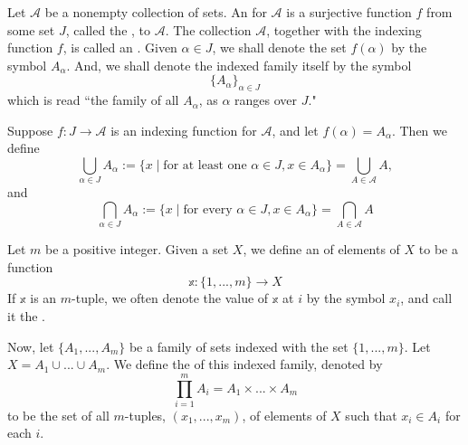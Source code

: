     \begin{definition}
        Let $\mathscr{A}$ be a nonempty collection of sets. An  for $\mathscr{A}$ is a surjective function $f$ from some set $J$, called the , to $\mathscr{A}$. The collection $\mathscr{A}$, together with the indexing function $f$, is called an . Given $\alpha \in J$, we shall denote the set $f(\alpha)$ by the symbol $A_{\alpha}$. And, we shall denote the indexed family itself by the symbol \begin{equation*}
            \{A_{\alpha}\}_{\alpha \in J}
        \end{equation*}
        which is read ``the family of all $A_{\alpha}$, as $\alpha$ ranges over $J$."
    \end{definition}

    \begin{definition}
        Suppose $f:J\rightarrow \mathscr{A}$ is an indexing function for $\mathscr{A}$, and let $f(\alpha) = A_{\alpha}$. Then we define \begin{equation*}
            \bigcup\limits_{\alpha \in J}A_{\alpha}:=\{x\;\vert\;\text{for at least one $\alpha \in J, x \in A_{\alpha}$}\} = \bigcup\limits_{A\in \mathscr{A}}A,
        \end{equation*}
        and \begin{equation*}
            \bigcap\limits_{\alpha \in J}A_{\alpha} :=\{x\;\vert\;\text{for every $\alpha \in J, x \in A_{\alpha}$}\} = \bigcap\limits_{A\in\mathscr{A}}A
        \end{equation*}
    \end{definition}


    \begin{definition}
        Let $m$ be a positive integer. Given a set $X$, we define an  of elements of $X$ to be a function \begin{equation*}
            \mathbb{x}:\{1,...,m\}\rightarrow X
        \end{equation*}
        If $\mathbb{x}$ is an $m$-tuple, we often denote the value of $\mathbb{x}$ at $i$ by the symbol $x_i$, and call it the .

        Now, let $\{A_1,...,A_m\}$ be a family of sets indexed with the set $\{1,...,m\}$. Let $X = A_1\cup ... \cup A_m$. We define the  of this indexed family, denoted by \begin{equation*}
            \prod\limits_{i=1}^mA_i = A_1\times ... \times A_m
        \end{equation*}
        to be the set of all $m$-tuples, $(x_1,...,x_m)$, of elements of $X$ such that $x_i \in A_i$ for each $i$.
    \end{definition}

